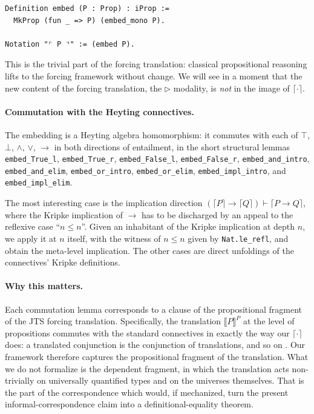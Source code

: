 \begin{lstlisting}
Definition embed (P : Prop) : iProp :=
  MkProp (fun _ => P) (embed_mono P).

Notation "⌜ P ⌝" := (embed P).
\end{lstlisting}

\noindent
This is the trivial part of the forcing translation: classical
propositional reasoning lifts to the forcing framework without
change.  We will see in a moment that the new content of
the forcing translation, the $\triangleright$ modality, is
\emph{not} in the image of $\lceil \cdot \rceil$.

\paragraph{Commutation with the Heyting connectives.}
The embedding is a Heyting algebra homomorphism: it commutes with
each of $\top$, $\bot$, $\wedge$, $\vee$, $\to$ in both directions of
entailment, in the short structural lemmas
\texttt{embed\_True\_l}, \texttt{embed\_True\_r},
\texttt{embed\_False\_l}, \texttt{embed\_False\_r},
\texttt{embed\_and\_intro}, \texttt{embed\_and\_elim},
\texttt{embed\_or\_intro}, \texttt{embed\_or\_elim},
\texttt{embed\_impl\_intro}, and \texttt{embed\_impl\_elim}.

\noindent
The most interesting case is the implication direction
$(\lceil P \rceil \to \lceil Q \rceil) \vdash \lceil P \to Q \rceil$,
where the Kripke implication of $\to$ has to be discharged by an
appeal to the reflexive case ``$n \le n$''.  Given an inhabitant of
the Kripke implication at depth $n$, we apply it at $n$ itself, with
the witness of $n \le n$ given by \texttt{Nat.le\_refl}, and obtain
the meta-level implication.  The other cases are direct unfoldings
of the connectives' Kripke definitions.

\paragraph{Why this matters.}
Each commutation lemma corresponds to a clause of the propositional
fragment of the JTS forcing translation.  Specifically, the
translation $\llbracket P \rrbracket^P$ at the level of propositions
commutes with the standard connectives in exactly the way our
$\lceil \cdot \rceil$ does: a translated conjunction is the
conjunction of translations, and so on \cite{jaber-tabareau-sozeau-2012}.
Our framework therefore captures the propositional fragment of the
translation.  What we do not formalize is the dependent fragment, in
which the translation acts non-trivially on universally quantified
types and on the universes themselves.  That is the part of the
correspondence which would, if mechanized, turn the present
informal-correspondence claim into a definitional-equality theorem.

